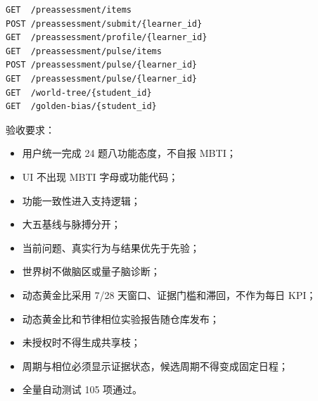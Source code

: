 \documentclass[UTF8,a4paper,11pt]{ctexart}
\begin{document}
\begin{verbatim}
GET  /preassessment/items
POST /preassessment/submit/{learner_id}
GET  /preassessment/profile/{learner_id}
GET  /preassessment/pulse/items
POST /preassessment/pulse/{learner_id}
GET  /preassessment/pulse/{learner_id}
GET  /world-tree/{student_id}
GET  /golden-bias/{student_id}
\end{verbatim}

验收要求：

\begin{itemize}
\item 用户统一完成 24 题八功能态度，不自报 MBTI；
\item UI 不出现 MBTI 字母或功能代码；
\item 功能一致性进入支持逻辑；
\item 大五基线与脉搏分开；
\item 当前问题、真实行为与结果优先于先验；
\item 世界树不做脑区或量子脑诊断；
\item 动态黄金比采用 7/28 天窗口、证据门槛和滞回，不作为每日 KPI；
\item 动态黄金比和节律相位实验报告随仓库发布；
\item 未授权时不得生成共享枝；
\item 周期与相位必须显示证据状态，候选周期不得变成固定日程；
\item 全量自动测试 105 项通过。
\end{itemize}
\end{document}
